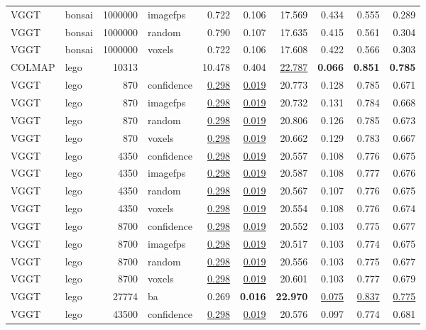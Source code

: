 \begin{table}[H]
\begin{tabular}{llrlrrrrrr}
VGGT & bonsai & 1000000 & imagefps & 0.722 & 0.106 & 17.569 & 0.434 & 0.555 & 0.289 \\
VGGT & bonsai & 1000000 & random & 0.790 & 0.107 & 17.635 & 0.415 & 0.561 & 0.304 \\
VGGT & bonsai & 1000000 & voxels & 0.722 & 0.106 & 17.608 & 0.422 & 0.566 & 0.303 \\
\midrule
COLMAP & lego & 10313 &  & 10.478 & 0.404 & \underline{22.787} & \textbf{0.066} & \textbf{0.851} & \textbf{0.785} \\
VGGT & lego & 870 & confidence & \underline{0.298} & \underline{0.019} & 20.773 & 0.128 & 0.785 & 0.671 \\
VGGT & lego & 870 & imagefps & \underline{0.298} & \underline{0.019} & 20.732 & 0.131 & 0.784 & 0.668 \\
VGGT & lego & 870 & random & \underline{0.298} & \underline{0.019} & 20.806 & 0.126 & 0.785 & 0.673 \\
VGGT & lego & 870 & voxels & \underline{0.298} & \underline{0.019} & 20.662 & 0.129 & 0.783 & 0.667 \\
VGGT & lego & 4350 & confidence & \underline{0.298} & \underline{0.019} & 20.557 & 0.108 & 0.776 & 0.675 \\
VGGT & lego & 4350 & imagefps & \underline{0.298} & \underline{0.019} & 20.587 & 0.108 & 0.777 & 0.676 \\
VGGT & lego & 4350 & random & \underline{0.298} & \underline{0.019} & 20.567 & 0.107 & 0.776 & 0.675 \\
VGGT & lego & 4350 & voxels & \underline{0.298} & \underline{0.019} & 20.554 & 0.108 & 0.776 & 0.674 \\
VGGT & lego & 8700 & confidence & \underline{0.298} & \underline{0.019} & 20.552 & 0.103 & 0.775 & 0.677 \\
VGGT & lego & 8700 & imagefps & \underline{0.298} & \underline{0.019} & 20.517 & 0.103 & 0.774 & 0.675 \\
VGGT & lego & 8700 & random & \underline{0.298} & \underline{0.019} & 20.556 & 0.103 & 0.775 & 0.677 \\
VGGT & lego & 8700 & voxels & \underline{0.298} & \underline{0.019} & 20.601 & 0.103 & 0.777 & 0.679 \\
VGGT & lego & 27774 & ba & 0.269 & \textbf{0.016} & \textbf{22.970} & \underline{0.075} & \underline{0.837} & \underline{0.775} \\
VGGT & lego & 43500 & confidence & \underline{0.298} & \underline{0.019} & 20.576 & 0.097 & 0.774 & 0.681 \\

\end{tabular}
\end{table}
